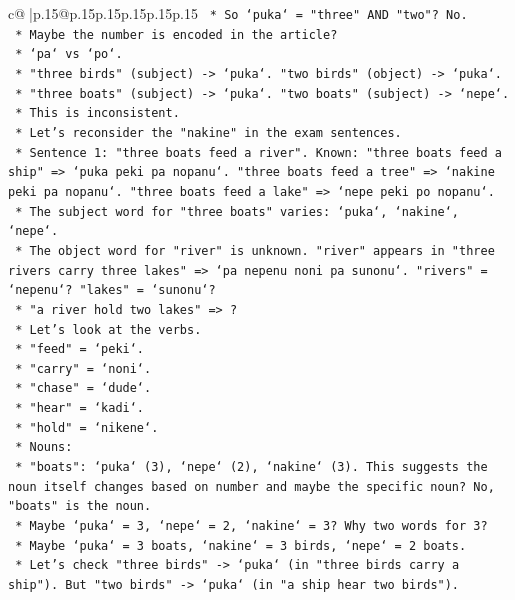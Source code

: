 \documentclass{article}
\begin{document}
{\begin{supertabular}{c@{$\;$}|p{.15\linewidth}@{}p{.15\linewidth}p{.15\linewidth}p{.15\linewidth}p{.15\linewidth}p{.15\linewidth}}
{{{\texttt{    *   So `puka` = "three" AND "two"? No.} \\
\texttt{    *   Maybe the number is encoded in the article?} \\
\texttt{    *   `pa` vs `po`.} \\
\texttt{    *   "three birds" (subject) {-}> `puka`. "two birds" (object) {-}> `puka`.} \\
\texttt{    *   "three boats" (subject) {-}> `puka`. "two boats" (subject) {-}> `nepe`.} \\
\texttt{    *   This is inconsistent.} \\
\texttt{    *   Let's reconsider the "nakine" in the exam sentences.} \\
\texttt{    *   Sentence 1: "three boats feed a river". Known: "three boats feed a ship" => `puka peki pa nopanu`. "three boats feed a tree" => `nakine peki pa nopanu`. "three boats feed a lake" => `nepe peki po nopanu`.} \\
\texttt{    *   The subject word for "three boats" varies: `puka`, `nakine`, `nepe`.} \\
\texttt{    *   The object word for "river" is unknown. "river" appears in "three rivers carry three lakes" => `pa nepenu noni pa sunonu`. "rivers" = `nepenu`? "lakes" = `sunonu`?} \\
\texttt{    *   "a river hold two lakes" => ?} \\
\texttt{    *   Let's look at the verbs.} \\
\texttt{    *   "feed" = `peki`.} \\
\texttt{    *   "carry" = `noni`.} \\
\texttt{    *   "chase" = `dude`.} \\
\texttt{    *   "hear" = `kadi`.} \\
\texttt{    *   "hold" = `nikene`.} \\
\texttt{    *   Nouns:} \\
\texttt{        *   "boats": `puka` (3), `nepe` (2), `nakine` (3). This suggests the noun itself changes based on number and maybe the specific noun? No, "boats" is the noun.} \\
\texttt{        *   Maybe `puka` = 3, `nepe` = 2, `nakine` = 3? Why two words for 3?} \\
\texttt{        *   Maybe `puka` = 3 boats, `nakine` = 3 birds, `nepe` = 2 boats.} \\
\texttt{        *   Let's check "three birds" {-}> `puka` (in "three birds carry a ship"). But "two birds" {-}> `puka` (in "a ship hear two birds").} \\
}}}
\end{supertabular}}
\end{document}

